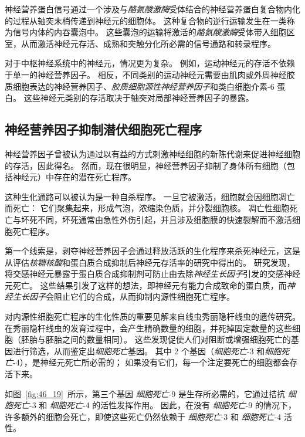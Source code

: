 神经营养蛋白信号通过一个涉及与\textit{酪氨酸激酶}受体结合的神经营养蛋白复合物内化的过程从轴突末梢传递到神经元的细胞体。
这种复合物的逆行运输发生在一类称为信号内体的内吞囊泡中。
这些囊泡的运输将激活的\textit{酪氨酸激酶}受体带入细胞区室，从而激活神经元存活、成熟和突触分化所必需的信号通路和转录程序。


对于中枢神经系统中的神经元，情况更为复杂。
例如，运动神经元的存活不依赖于单一的神经营养因子。
相反，不同类别的运动神经元需要由肌肉或外周神经胶质细胞表达的神经营养因子、\textit{胶质细胞源性神经营养因子}和类白细胞介素-6 蛋白。
这些神经元类别的存活取决于轴突对局部神经营养因子的暴露。



\subsection{神经营养因子抑制潜伏细胞死亡程序}

神经营养因子曾被认为通过以有益的方式刺激神经细胞的新陈代谢来促进神经细胞的存活，因此得名。
然而，现在很明显，神经营养因子抑制了身体所有细胞（包括神经元）中存在的潜在死亡程序。


这种生化通路可以被认为是一种自杀程序。
一旦它被激活，细胞就会因细胞凋亡而死亡：
它们聚集起来，形成气泡，浓缩染色质，并分裂细胞核。
凋亡性细胞死亡与坏死不同，坏死通常由急性外伤引起，并且涉及细胞膜的快速裂解而不激活细胞死亡程序。


第一个线索是，剥夺神经营养因子会通过释放活跃的生化程序来杀死神经元，这是从评估\textit{核糖核酸}和蛋白质合成抑制后神经元存活率的研究中得出的。
研究发现，将交感神经元暴露于蛋白质合成抑制剂可防止由去除\textit{神经生长因子}引发的交感神经元死亡。
这些结果引发了这样的想法，即神经元有能力合成致命的蛋白质，而\textit{神经生长因子}会阻止它们的合成，从而抑制内源性细胞死亡程序。


对内源性细胞死亡程序的生化性质的重要见解来自线虫秀丽隐杆线虫的遗传研究。
在秀丽隐杆线虫的发育过程中，会产生精确数量的细胞，并死掉固定数量的这些细胞（胚胎与胚胎之间的数量相同）。
这些发现促使人们对阻断或增强细胞死亡的基因进行筛选，从而鉴定出\textit{细胞死亡}基因。
其中 2 个基因（\textit{细胞死亡}-3 和\textit{细胞死亡}-4），是神经元死亡所必需的；
如果没有它们，每一个注定要死亡的细胞都会存活下来。

如图~\ref{fig:46_19}~所示，第三个基因 \textit{细胞死亡}-9 是生存所必需的，它通过拮抗 \textit{细胞死亡}-3 和 \textit{细胞死亡}-4 的活性发挥作用。
因此，在没有 \textit{细胞死亡}-9 的情况下，许多额外的细胞会死亡，即使这些死亡仍然依赖于 \textit{细胞死亡}-3 和 \textit{细胞死亡}-4 活性。


